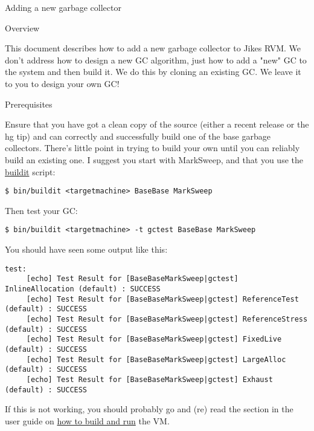 \begin{section}{Adding a new garbage collector}
\label{sec:addinganewgarbagecollector}


\begin{subsection}{Overview}

This document describes how to add a new garbage collector to Jikes RVM.  We don't address how to design a new GC algorithm, just how to add a "new" GC to the system and then build it.  We do this by cloning an existing GC.  We leave it to you to design your own GC!

\end{subsection}

\begin{subsection}{Prerequisites}

Ensure that you have got a clean copy of the source (either a recent release or the hg tip) and can correctly and successfully build one of the base garbage collectors.  There's little point in trying to build your own until you can reliably build an existing one.  I suggest you start with MarkSweep, and that you use the \hyperref[sec:usingbuildit]{buildit} script:

\begin{lstlisting}
$ bin/buildit <targetmachine> BaseBase MarkSweep
\end{lstlisting}

Then test your GC:

\begin{lstlisting}
$ bin/buildit <targetmachine> -t gctest BaseBase MarkSweep
\end{lstlisting}

You should have seen some output like this:

\begin{lstlisting}
test:
     [echo] Test Result for [BaseBaseMarkSweep|gctest] InlineAllocation (default) : SUCCESS
     [echo] Test Result for [BaseBaseMarkSweep|gctest] ReferenceTest (default) : SUCCESS
     [echo] Test Result for [BaseBaseMarkSweep|gctest] ReferenceStress (default) : SUCCESS
     [echo] Test Result for [BaseBaseMarkSweep|gctest] FixedLive (default) : SUCCESS
     [echo] Test Result for [BaseBaseMarkSweep|gctest] LargeAlloc (default) : SUCCESS
     [echo] Test Result for [BaseBaseMarkSweep|gctest] Exhaust (default) : SUCCESS  
\end{lstlisting}

If this is not working, you should probably go and (re) read the section in the user guide on \hyperref[cha:careandfeeding]{how to build and run} the VM.


\end{subsection}
\end{section}
